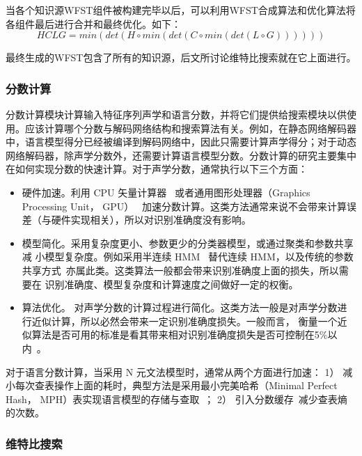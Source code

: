 当各个知识源WFST组件被构建完毕以后，可以利用WFST合成算法和优化算法将各组件最后进行合并和最终优化。如下：
\begin{equation}
HCLG = min(det(H \circ min(det(C \circ min(det(L \circ G))))))
\end{equation}

最终生成的WFST包含了所有的知识源，后文所讨论维特比搜索就在它上面进行。

\subsubsection{分数计算}

分数计算模块计算输入特征序列声学和语言分数，并将它们提供给搜索模块以供使用。应该计算哪个分数与解码网络结构和搜索算法有关。例如，在静态网络解码器中，语言模型得分已经被编译到解码网络中，因此只需要计算声学得分；对于动态网络解码器，除声学分数外，还需要计算语言模型分数。分数计算的研究主要集中在如何实现分数的快速计算。对于声学分数，通常执行以下三个方面：

\begin{itemize}
\item 硬件加速。利用 CPU 矢量计算器~\cite{kanthak2000using}
或者通用图形处理器（Graphics Processing Unit， GPU）~\cite{chong2009fully}
加速分数计算。这类方法通常来说不会带来计算误差（与硬件实现相关），所以对识别准确度没有影响。
\item 模型简化。采用复杂度更小、参数更少的分类器模型，或通过聚类和参数共享减
小模型复杂度。例如采用半连续 HMM~\cite{huang1990semi} 替代连续 HMM，以及传统的参数共享方式~\cite{young2002htk}亦属此类。这类算法一般都会带来识别准确度上面的损失，所以需要在
识别准确度、模型复杂度和计算速度之间做好一定的权衡。
\item 算法优化。 对声学分数的计算过程进行简化。这类方法一般是对声学分数进行近似计算，所以必然会带来一定识别准确度损失。一般而言， 衡量一个近似算法是否可用的标准是看其带来相对识别准确度损失是否可控制在5\%以内~\cite{cai2009efficient}。
\end{itemize}

对于语言分数计算，当采用 N 元文法模型时，通常从两个方面进行加速： 1）
减小每次查表操作上面的耗时，典型方法是采用最小完美哈希（Minimal Perfect Hash，
MPH）表实现语言模型的存储与查取~\cite{li2007fast,cardenal2002fast}； 2） 引入分数缓存~\cite{huijbregts2008fast}减少查表熵的次数。

\subsubsection{维特比搜索}

